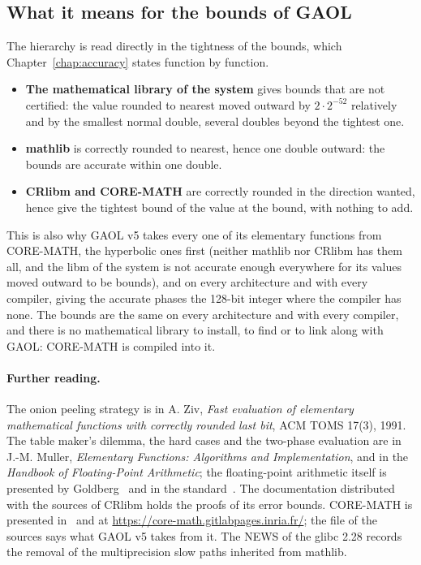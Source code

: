 \documentclass[12pt,a4paper,twoside,openright]{book}
\begin{document}
\subsection{What it means for the bounds of GAOL}

The hierarchy is read directly in the tightness of the bounds, which
Chapter~\ref{chap:accuracy} states function by function.
\begin{itemize}
\item[$\bullet$] \textbf{The mathematical library of the system} gives
  bounds that are not certified: the value rounded to nearest moved outward
  by $2\cdot2^{-52}$ relatively and by the smallest normal double, several
  doubles beyond the tightest one.
\item[$\bullet$] \textbf{mathlib} is correctly rounded to nearest, hence
  one double outward: the bounds are accurate within one double.
\item[$\bullet$] \textbf{CRlibm and CORE-MATH} are correctly rounded in the
  direction wanted, hence give the tightest bound of the value at the
  bound, with nothing to add.
\end{itemize}
\noindent This is also why GAOL v5 takes every one of its elementary
functions from CORE-MATH, the hyperbolic ones first (neither mathlib nor
CRlibm has them all, and the libm of the system is not accurate enough
everywhere for its values moved outward to be bounds), and on every
architecture and with every compiler,  giving
the accurate phases the 128-bit integer where the compiler has none. The
bounds are the same on every architecture and with every compiler, and
there is no mathematical library to install, to find or to link along with
GAOL: CORE-MATH is compiled into it.\newinvfive

\paragraph{Further reading.} The onion peeling strategy is in A. Ziv,
\emph{Fast evaluation of elementary mathematical functions with correctly
rounded last bit}, ACM TOMS 17(3), 1991. The table maker's dilemma, the
hard cases and the two-phase evaluation are in J.-M. Muller,
\emph{Elementary Functions: Algorithms and Implementation}, and in the
\emph{Handbook of Floating-Point Arithmetic}; the floating-point arithmetic
itself is presented by Goldberg~\cite{Goldberg:01} and in the
standard~\cite{IEEE754:90}. The documentation distributed with the sources
of CRlibm holds the proofs of its error bounds. CORE-MATH is presented
in~\cite{CoreMath:2022} and at \url{https://core-math.gitlabpages.inria.fr/};
the file  of the sources says what GAOL v5 takes from
it. The NEWS of the glibc 2.28 records the removal of the multiprecision
slow paths inherited from mathlib.
\end{document}
